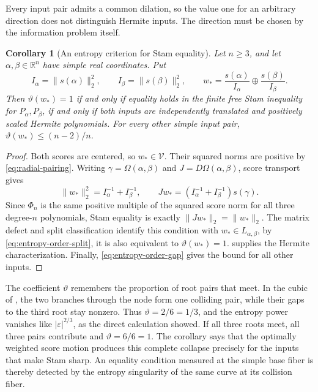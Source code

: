 \documentclass[12pt,reqno]{amsart}
\newtheorem{corollary}[corollary]{Corollary}
\theoremstyle{definition}
\theoremstyle{remark}
\newcommand{\R}{\mathbb R}
\newcommand{\eps}{\varepsilon}
\begin{document}
Every input pair admits a common dilation, so the value one for an
arbitrary direction does not distinguish Hermite inputs.  The direction
must be chosen by the information problem itself.

\begin{samepage}
\begin{corollary}[An entropy criterion for Stam equality]
\label{cor:score-entropy-equality}
Let \(n\geq3\), and let \(\alpha,\beta\in\R^n\) have simple
real coordinates.  Put
\begin{equation}\label{eq:optimal-score-direction}
 I_\alpha=\|s(\alpha)\|_2^2,\qquad
 I_\beta=\|s(\beta)\|_2^2,\qquad
 w_* = \frac{s(\alpha)}{I_\alpha}
          \oplus\frac{s(\beta)}{I_\beta}.
\end{equation}
Then \(\vartheta(w_*)=1\) if and only if equality holds in the
finite free Stam inequality for \(P_\alpha,P_\beta\), if and
only if both inputs are independently translated and positively scaled
Hermite polynomials.  For every other simple input pair,
\(\vartheta(w_*)\leq(n-2)/n\).
\end{corollary}
\end{samepage}

\begin{proof}
Both scores are centered, so \(w_*\in\mathcal V\).  Their
squared norms are positive by \eqref{eq:radial-pairing}.
Writing \(\gamma=\Omega(\alpha,\beta)\) and
\(J=D\Omega(\alpha,\beta)\), score transport gives
\begin{equation}\label{eq:optimal-score-norms}
 \|w_*\|_2^2=I_\alpha^{-1}+I_\beta^{-1},\qquad
 Jw_*=(I_\alpha^{-1}+I_\beta^{-1})s(\gamma).
\end{equation}
Since \(\Phi_n\) is the same positive multiple of the squared
score norm for all three degree-\(n\) polynomials, Stam equality
is exactly \(\|Jw_*\|_2=\|w_*\|_2\).
The matrix defect and split classification identify this condition with
\(w_*\in L_{\alpha,\beta}\), by \eqref{eq:entropy-order-split}, it is also equivalent to
\(\vartheta(w_*)=1\).
 supplies the Hermite
characterization.  Finally, \eqref{eq:entropy-order-gap} gives
the bound for all other inputs.
\end{proof}

The coefficient \(\vartheta\) remembers the proportion of root
pairs that meet.  In the cubic of
, the two branches through the
node form one colliding pair, while their gaps to the third root stay
nonzero.  Thus \(\vartheta=2/6=1/3\), and the entropy power
vanishes like \(|\eps|^{2/3}\), as the direct calculation showed.
If all three roots meet, all three pairs contribute and
\(\vartheta=6/6=1\).  The corollary says that the optimally
weighted score motion produces this complete collapse precisely for
the inputs that make Stam sharp.  An equality condition measured at
the simple base fiber is thereby detected by the entropy singularity
of the same curve at its collision fiber.
\end{document}
